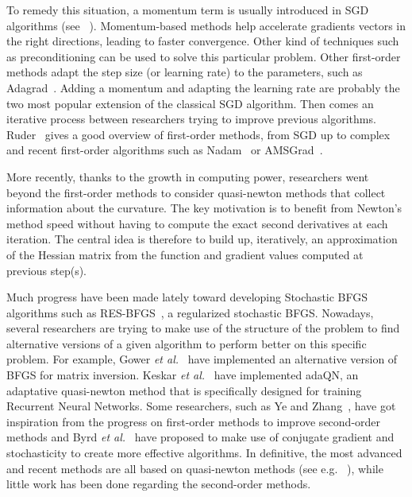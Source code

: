 \documentclass[conference]{IEEEtran}
\begin{document}
 To remedy this situation, a momentum term is usually introduced in SGD algorithms (see ~\cite{qian_momentum_1999}). Momentum-based methods help accelerate gradients vectors in the right directions, leading to faster convergence. Other kind of techniques such as preconditioning can be used to solve this particular problem. Other first-order methods adapt the step size (or learning rate) to the parameters, such as Adagrad~\cite{duchi_adaptive_2011}. Adding a momentum and adapting the learning rate are probably the two most popular extension of the classical SGD algorithm. Then comes an iterative process between researchers trying to improve previous algorithms. Ruder~\cite{ruder_overview_2016} gives a good overview of first-order methods, from SGD up to complex and recent first-order algorithms such as Nadam~\cite{dozat_incorporating_2016} or AMSGrad~\cite{reddi_convergence_2018}. 

More recently, thanks to the growth in computing power, researchers went beyond the first-order methods to consider quasi-newton methods that collect information about the curvature. The key motivation is to benefit from Newton's method speed without having to compute the exact second derivatives at each iteration. The central idea is therefore to build up, iteratively, an approximation of the Hessian matrix from the function and gradient values computed at previous step(s). 

Much progress have been made lately toward developing Stochastic BFGS algorithms such as RES-BFGS~\cite{mokhtari_res:_2014}, a regularized stochastic BFGS. Nowadays, several researchers are trying to make use of the structure of the problem to find alternative versions of a given algorithm to perform better on this specific problem. For example, Gower {\it et al.}~\cite{gower_accelerated_2018} have implemented an alternative version of BFGS for matrix inversion. Keskar {\it et al.}~\cite{keskar_adaqn:_2016} have implemented adaQN, an adaptative quasi-newton method that is specifically designed for training Recurrent Neural Networks. Some researchers, such as Ye and Zhang~\cite{ye_nestrovs_2017}, have got inspiration from the progress on first-order methods to improve second-order methods and Byrd {\it et al.}~\cite{byrd_use_2011} have proposed to make use of conjugate gradient and stochasticity to create more effective algorithms. In definitive, the most advanced and recent methods are all based on quasi-newton methods (see e.g. ~\cite{kiros_training_2013,bordes_sgd-qn:_2009,bordes_erratum:_2010,agarwal_second-order_2016}), while little work has been done regarding the second-order methods.
\end{document}
